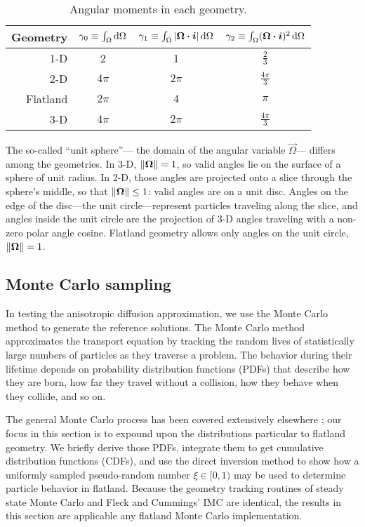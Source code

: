 \begin{table}[htb]
  \centering
  \begin{tabular}{rccc}
\toprule
   Geometry
   & $\gamma_0 \equiv \int_\Omega \mathop{}\!\mathrm{d}\Omega$
   & $\gamma_1 \equiv \int_\Omega \left| \bm{\Omega}\bm{\cdot}\bm{i} \right| \mathop{}\!\mathrm{d}\Omega$
   & $\gamma_2 \equiv \int_\Omega (\bm{\Omega}\bm{\cdot}\bm{i})^2 \mathop{}\!\mathrm{d}\Omega$
\\ \midrule
   1-D & 2 & 1 & $\frac{2}{3}$
   \\
   2-D & $4\pi$ & $2\pi$ & $\frac{4\pi}{3}$
   \\
   Flatland & $2\pi$ & $4$ & $\pi$
   \\
   3-D & $4\pi$ & $2\pi$ & $\frac{4\pi}{3}$
\\ \bottomrule
  \end{tabular}
  \caption{Angular moments in each geometry.}
  \label{tab:angularMoments}
\end{table}

The so-called ``unit sphere''---%
the domain of the angular variable $\vec{\Omega}$---%
differs among the geometries. In 3-D, $\left\| \bm{\Omega} \right\|=1$, so valid angles
lie on the surface of a sphere of unit radius. In 2-D, those angles are
projected onto a slice through the sphere's middle, so that
$\left\| \bm{\Omega} \right\| \le 1$: valid angles are on a unit disc. Angles on the edge
of the disc---the unit circle---represent particles traveling along the slice,
and angles inside the unit circle are the projection of 3-D angles traveling with a
non-zero polar angle cosine. Flatland geometry allows only angles on the unit
circle, $\left\| \bm{\Omega} \right\|=1$.

\subsection{Monte Carlo sampling}

In testing the anisotropic diffusion approximation, we use the Monte Carlo
method to generate the reference solutions.
The Monte Carlo method approximates the transport equation by tracking the
random lives of statistically large numbers of particles as they traverse a
problem. The behavior during their lifetime depends on probability distribution
functions (PDFs) that describe how they are born, how far they travel without a
collision, how they behave when they collide, and so on.

The general Monte Carlo process has been covered extensively elsewhere
\cite{Lew1984,Bro2004a}; our focus in this section is to expound upon the
distributions particular to flatland geometry.
We briefly derive those PDFs,
integrate them to get cumulative distribution functions
(CDFs), and use the direct inversion method to show how a uniformly sampled
pseudo-random number $\xi \in [0,1)$ may be used to determine particle behavior
in flatland. Because the geometry tracking routines of steady state Monte Carlo
and Fleck and Cummings' IMC are identical, the results in this section are
applicable any flatland Monte Carlo implementation.

